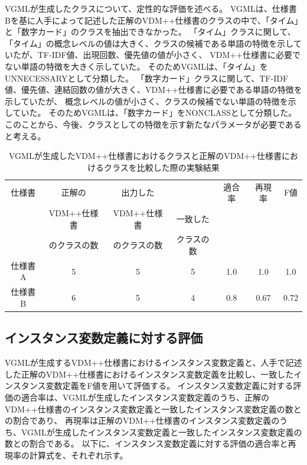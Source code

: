 VGMLが生成したクラスについて、定性的な評価を述べる。
VGMLは、仕様書Bを基に人手によって記述した正解のVDM++仕様書のクラスの中で、「タイム」と「数字カード」のクラスを抽出できなかった。
「タイム」クラスに関して、「タイム」の概念レベルの値は大きく、クラスの候補である単語の特徴を示していたが、TF-IDF値、出現回数、優先値の値が小さく、
VDM++仕様書に必要でない単語の特徴を大きく示していた。
そのためVGMLは、「タイム」をUNNECESSARYとして分類した。
「数字カード」クラスに関して、TF-IDF値、優先値、連結回数の値が大きく、VDM++仕様書に必要である単語の特徴を示していたが、
概念レベルの値が小さく、クラスの候補でない単語の特徴を示していた。
そのためVGMLは、「数字カード」をNONCLASSとして分類した。
このことから、今後、クラスとしての特徴を示す新たなパラメータが必要であると考える。

\begin{table}[t]
	\caption{VGMLが生成したVDM++仕様書におけるクラスと正解のVDM++仕様書におけるクラスを比較した際の実験結果}
	\label{table:classResult}
	\begin{center}
        \begin{tabular}{c|c|c|c|c|c|c}
            \hline
            仕様書  & 正解の & 出力した &  & 適合率 & 再現率 & F値  \\
                    & VDM++仕様書 & VDM++仕様書 &  一致した       &        &       &      \\
                    & のクラスの数 & のクラスの数 & クラスの数  &        &       &      \\
            \hline
            仕様書A & 5                             & 5                 & 5                  & 1.0   & 1.0    & 1.0  \\
            \hline
            仕様書B & 6                             & 5                  & 4                  & 0.8   & 0.67   & 0.72 \\
            \hline
        \end{tabular}
    \end{center}
\end{table}

\subsection{インスタンス変数定義に対する評価}
VGMLが生成するVDM++仕様書におけるインスタンス変数定義と、人手で記述した正解のVDM++仕様書におけるインスタンス変数定義を比較し、一致したインスタンス変数定義をF値を用いて評価する。
インスタンス変数定義に対する評価の適合率は、VGMLが生成したインスタンス変数定義のうち、正解のVDM++仕様書のインスタンス変数定義と一致したインスタンス変数定義の数との割合であり、
再現率は正解のVDM++仕様書のインスタンス変数定義のうち、VGMLが生成したインスタンス変数定義と一致したインスタンス変数定義の数との割合である。
以下に、インスタンス変数定義に対する評価の適合率と再現率の計算式を、それぞれ示す。

